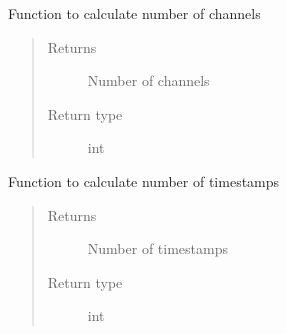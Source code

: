 \documentclass[letterpaper,10pt,english]{sphinxmanual}
\begin{document}
\begin{fulllineitems}
\begin{fulllineitems}
\end{fulllineitems}


\begin{fulllineitems}
\label{\detokenize{paircars:paircars.access_ms.AccessMS.get_num_channels}}
\sphinxAtStartPar
Function to calculate number of channels
\begin{quote}\begin{description}
\item[{Returns}] \leavevmode
\sphinxAtStartPar
Number of channels

\item[{Return type}] \leavevmode
\sphinxAtStartPar
int

\end{description}\end{quote}

\end{fulllineitems}


\begin{fulllineitems}
\label{\detokenize{paircars:paircars.access_ms.AccessMS.get_num_timestamps}}
\sphinxAtStartPar
Function to calculate number of timestamps
\begin{quote}\begin{description}
\item[{Returns}] \leavevmode
\sphinxAtStartPar
Number of timestamps

\item[{Return type}] \leavevmode
\sphinxAtStartPar
int

\end{description}\end{quote}

\end{fulllineitems}



\end{fulllineitems}
\end{document}
